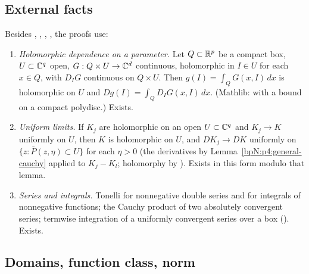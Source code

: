 \subsection{External facts}\label{bpN:p4:s-ext}
Besides , , , , the proofs use:
\begin{enumerate}[label=(E\arabic*),leftmargin=2.2em]
\item\label{bpN:p4:ext-param} \emph{Holomorphic dependence on a parameter.} Let $Q\subset\mathbb{R}^p$ be a compact box, $U\subset\mathbb{C}^q$ open, $G:Q\times U\to\mathbb{C}^d$ continuous,
  holomorphic in $I\in U$ for each $x\in Q$, with $D_IG$ continuous on $Q\times U$. Then $g(I)=\int_QG(x,I)\,dx$ is holomorphic on $U$ and $Dg(I)=\int_QD_IG(x,I)\,dx$.
  (Mathlib:  with a bound on a compact polydisc.) Exists.
\item\label{bpN:p4:ext-weier} \emph{Uniform limits.} If $K_j$ are holomorphic on an open $U\subset\mathbb{C}^q$ and $K_j\to K$ uniformly on $U$, then $K$ is holomorphic on $U$, and $DK_j\to DK$ uniformly on
  $\{z:\bar P(z,\eta)\subset U\}$ for each $\eta>0$ (the derivatives by Lemma~\ref{bpN:p4:general-cauchy} applied to $K_j-K_l$; holomorphy by ). Exists in this form modulo that lemma.
\item\label{bpN:p4:ext-series} \emph{Series and integrals.} Tonelli for nonnegative double series and for integrals of nonnegative functions; the Cauchy product of two absolutely convergent series;
  termwise integration of a uniformly convergent series over a box (). Exists.
\end{enumerate}

\subsection{Domains, function class, norm}\label{bpN:p4:s-def}

